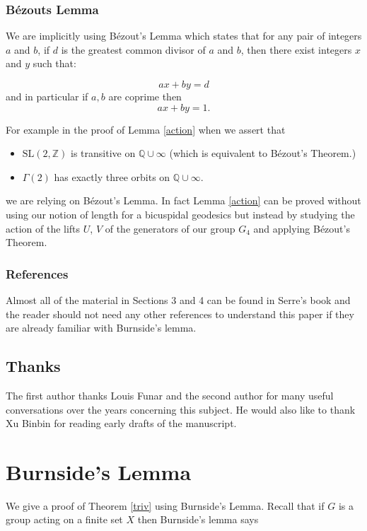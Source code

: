 \documentclass[12pt,a4paper]{amsart}
\def\KK{G_4}
\def\ZZ{\mathbb{Z}}
\def\QQ{\mathbb{Q}}
\def\sl2{\mathrm{SL}(2, \ZZ)}
\def\g2{\Gamma(2)}
\begin{document}
 
 \subsubsection{Bézouts Lemma}
 We are implicitly using  Bézout's Lemma which 
 states that for any pair of integers \(a\) and \(b\), if \(d\) is the greatest common divisor of \(a\) and \(b\), then there exist integers \(x\) and \(y\) such that:

\[
ax + by = d
\]
and in particular if $a,b$ are coprime then
$$ax + by = 1.$$

 For example in the proof of Lemma \ref{action}
 when we assert that
 \begin{itemize}
 \item $\sl2$ is transitive on $\QQ \cup \infty$ (which is equivalent to Bézout's Theorem.)
 \item $\g2$ has exactly three orbits on $\QQ \cup \infty$.
 \end{itemize}
 we are relying on Bézout's Lemma.
In fact Lemma \ref{action} can be proved
 without using our notion of length for a bicuspidal geodesics 
 but  instead by studying the action of 
 the lifts $U$, $V$  of the generators of our group $\KK$  
 and applying Bézout's Theorem.
 
 
 \subsubsection{References}
Almost all  of the material in Sections 3 and 4 
can be found in Serre's book \cite{serre} and the reader
should not need any other references to understand 
this paper if they are already familiar with  Burnside's lemma.
 

\subsection{Thanks}

The first author thanks Louis Funar and the second author for  many
useful conversations over the years concerning this subject. He would
also like to thank Xu Binbin for reading early drafts of the
manuscript.


\section{Burnside's Lemma} \label{burnside}

We give a proof of Theorem \ref{triv} using Burnside's Lemma.
Recall that if $G$ is  a group acting on a finite set $X$ then
Burnside's lemma says
\end{document}
